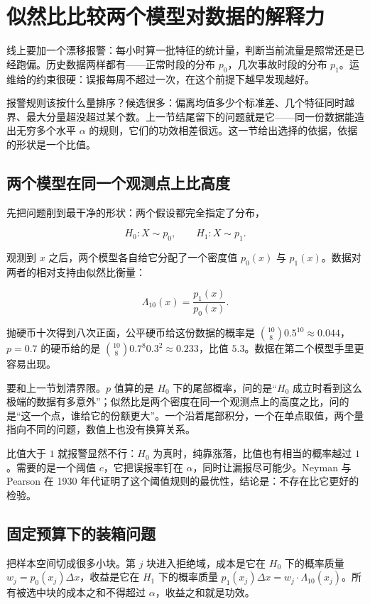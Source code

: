 \section{似然比比较两个模型对数据的解释力}
\label{sec:11-Mathematical-Statistics/05-Hypothesis-Testing/03}

线上要加一个漂移报警：每小时算一批特征的统计量，判断当前流量是照常还是已经跑偏。历史数据两样都有——正常时段的分布 \(p_0\)，几次事故时段的分布 \(p_1\)。运维给的约束很硬：误报每周不超过一次，在这个前提下越早发现越好。

报警规则该按什么量排序？候选很多：偏离均值多少个标准差、几个特征同时越界、最大分量超没超过某个数。上一节结尾留下的问题就是它——同一份数据能造出无穷多个水平 \(\alpha\) 的规则，它们的功效相差很远。这一节给出选择的依据，依据的形状是一个比值。

\subsection{两个模型在同一个观测点上比高度}

先把问题削到最干净的形状：两个假设都完全指定了分布，

\[
H_0:X\sim p_0,\qquad H_1:X\sim p_1 .
\]

观测到 \(x\) 之后，两个模型各自给它分配了一个密度值 \(p_0(x)\) 与 \(p_1(x)\)。数据对两者的相对支持由似然比衡量：

\[
\Lambda_{10}(x)=\frac{p_1(x)}{p_0(x)} .
\]

抛硬币十次得到八次正面，公平硬币给这份数据的概率是 \(\binom{10}{8}0.5^{10}\approx 0.044\)，\(p=0.7\) 的硬币给的是 \(\binom{10}{8}0.7^{8}0.3^{2}\approx 0.233\)，比值 \(5.3\)。数据在第二个模型手里更容易出现。

要和上一节划清界限。\(p\) 值算的是 \(H_0\) 下的尾部概率，问的是``\(H_0\) 成立时看到这么极端的数据有多意外''；似然比是两个密度在同一个观测点上的高度之比，问的是``这一个点，谁给它的份额更大''。一个沿着尾部积分，一个在单点取值，两个量指向不同的问题，数值上也没有换算关系。

比值大于 \(1\) 就报警显然不行：\(H_0\) 为真时，纯靠涨落，比值也有相当的概率越过 \(1\)。需要的是一个阈值 \(c\)，它把误报率钉在 \(\alpha\)，同时让漏报尽可能少。Neyman 与 Pearson 在 1930 年代证明了这个阈值规则的最优性，结论是：不存在比它更好的检验。

\subsection{固定预算下的装箱问题}

把样本空间切成很多小块。第 \(j\) 块进入拒绝域，成本是它在 \(H_0\) 下的概率质量 \(w_j=p_0(x_j)\Delta x\)，收益是它在 \(H_1\) 下的概率质量 \(p_1(x_j)\Delta x=w_j\cdot\Lambda_{10}(x_j)\)。所有被选中块的成本之和不得超过 \(\alpha\)，收益之和就是功效。

